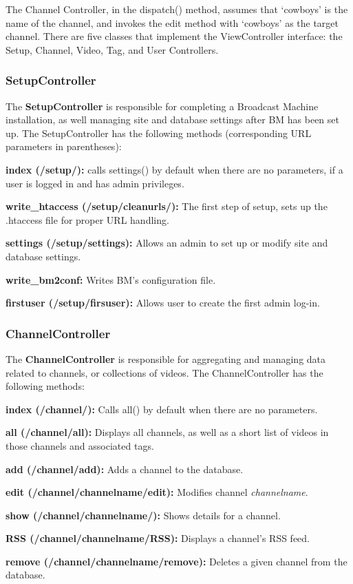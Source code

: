 \documentclass[a4paper,12pt]{report}
\newcommand{\scare}[1]{`#1'}
\begin{document}
The Channel Controller, in the dispatch() method, assumes that \scare{cowboys} is the name of the channel, and invokes the edit method with \scare{cowboys} as the target channel. There are five classes that implement the ViewController interface: the Setup, Channel, Video, Tag, and User Controllers. \\

\subsubsection{SetupController}
The \textbf{SetupController} is responsible for completing a Broadcast Machine installation, as well managing site  and database settings after BM has been set up. The SetupController has the following methods (corresponding URL parameters in parentheses):
\begin{description}
\item{\textbf{index (/setup/): }calls settings() by default when there are no parameters, if a user is logged in and has admin privileges.}
\item{\textbf{write\_htaccess (/setup/cleanurls/): }The first step of setup, sets up the .htaccess file for proper URL handling.}
\item{\textbf{settings (/setup/settings): } Allows an admin to set up or modify site and database settings.}
\item{\textbf{write\_bm2conf: } Writes BM's configuration file.}
\item{\textbf{firstuser (/setup/firsuser): } Allows user to create the first admin log-in.} \\
\end{description} 

\subsubsection{ChannelController}
The \textbf{ChannelController} is responsible for aggregating and managing data related to channels, or collections of videos. The ChannelController has the following methods:
\begin{description}
\item{\textbf{index (/channel/): } Calls all() by default when there are no parameters.}
\item{\textbf{all (/channel/all): } Displays all channels, as well as a short list of videos in those channels and associated tags.}
\item{\textbf{add (/channel/add): } Adds a channel to the database.}
\item{\textbf{edit (/channel/channelname/edit): } Modifies channel \textit{channelname}.}
\item{\textbf{show (/channel/channelname/): } Shows details for a channel.}
\item{\textbf{RSS (/channel/channelname/RSS): } Displays a channel's RSS feed.}
\item{\textbf{remove (/channel/channelname/remove): } Deletes a given channel from the database.} \\
\end{description} 
\end{document}
